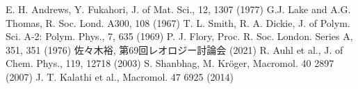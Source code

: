 \begin{columns}[totalwidth=.85\linewidth]
    \column{\textwidth}
        \beamertemplatetextbibitems
        \small
        \begin{thebibliography}{99}
             E. H. Andrews, Y. Fukahori, J. of Mat. Sci., 12, 1307 (1977)
             G.J. Lake and A.G. Thomas, R. Soc. Lond. A300, 108 (1967)
             T. L. Smith, R. A. Dickie, J. of Polym. Sci. A-2: Polym. Phys., 7, 635 (1969)
             P. J. Flory, Proc. R. Soc. London. Series A, 351, 351 (1976)
             佐々木裕, 第69回レオロジー討論会 (2021)
             R. Auhl et al., J. of Chem. Phys., 119, 12718 (2003)
             S. Shanbhag, M. Kr\"{o}ger, Macromol. 40 2897 (2007)
             J. T. Kalathi et al., Macromol. 47 6925 (2014)
        \end{thebibliography}
    \end{columns}